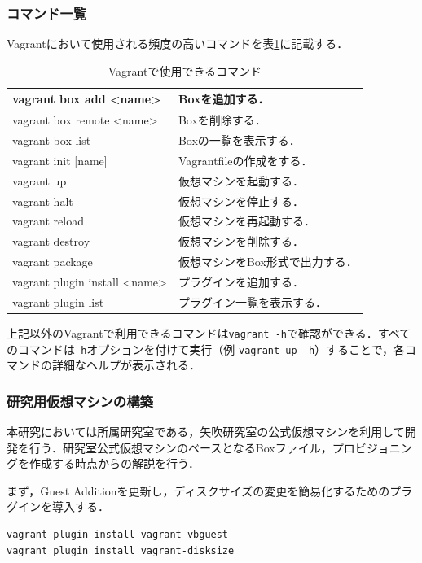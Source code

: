 \subsubsection{コマンド一覧}

Vagrantにおいて使用される頻度の高いコマンドを表\ref{table:Vagrant}に記載する．

\begin{table}[htb]
\caption{Vagrantで使用できるコマンド}
\label{table:Vagrant}
\begin{tabular}{|p{5cm}|p{7.5cm}|} \hline
vagrant box add <name> & Boxを追加する．\\ \hline
vagrant box remote <name> & Boxを削除する．\\ \hline
vagrant box list & Boxの一覧を表示する．\\ \hline
vagrant init [name] & Vagrantfileの作成をする．\\ \hline
vagrant up & 仮想マシンを起動する．\\ \hline
vagrant halt & 仮想マシンを停止する．\\ \hline
vagrant reload & 仮想マシンを再起動する．\\ \hline
vagrant destroy & 仮想マシンを削除する．\\ \hline
vagrant package & 仮想マシンをBox形式で出力する．\\ \hline
vagrant plugin install <name> & プラグインを追加する．\\ \hline
vagrant plugin list & プラグイン一覧を表示する．\\ \hline
\end{tabular}
\end{table}

上記以外のVagrantで利用できるコマンドは\texttt{vagrant -h}で確認ができる．すべてのコマンドは\texttt{-h}オプションを付けて実行（例 \texttt{vagrant up -h}）することで，各コマンドの詳細なヘルプが表示される．

\newpage

\subsubsection{研究用仮想マシンの構築}

本研究においては所属研究室である，矢吹研究室の公式仮想マシンを利用して開発を行う．研究室公式仮想マシンのベースとなるBoxファイル，プロビジョニングを作成する時点からの解説を行う．

まず，Guest Additionを更新し，ディスクサイズの変更を簡易化するためのプラグインを導入する．
\begin{verbatim}
vagrant plugin install vagrant-vbguest
vagrant plugin install vagrant-disksize
\end{verbatim}

